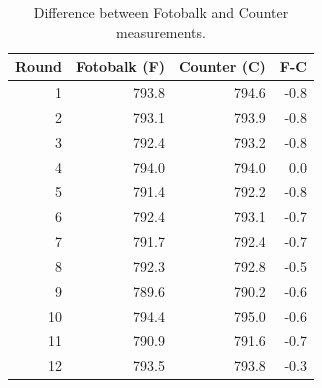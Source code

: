 \documentclass[compress]{beamer}        %
\begin{document}
\begin{frame}
\large
\begin{table}[h!]

\begin{center}

\begin{tabular}{rrrr}
  \hline
 Round& Fotobalk (F) & Counter (C) & F-C \\
  \hline
1 & 793.8& 794.6 & -0.8 \\
  2 & 793.1 & 793.9 & -0.8 \\
  3 & 792.4 & 793.2 & -0.8 \\
  4 & 794.0 & 794.0 & 0.0 \\
  5 & 791.4 & 792.2 & -0.8 \\
  6 & 792.4 & 793.1 & -0.7 \\
  7 & 791.7 & 792.4 & -0.7 \\
  8 & 792.3 & 792.8 & -0.5 \\
  9 & 789.6 & 790.2 & -0.6 \\
  10 & 794.4 & 795.0 & -0.6 \\
  11 & 790.9 & 791.6 & -0.7 \\
  12 & 793.5 & 793.8 & -0.3 \\
   \hline
\end{tabular}
\caption{Difference between Fotobalk and Counter measurements.}
\end{center}
\end{table}
\end{frame}
\end{document}
